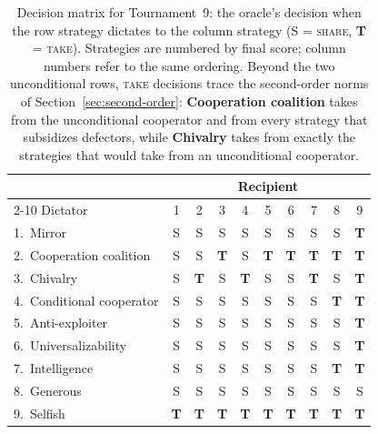 
\newcommand{\dS}{S}
\newcommand{\dT}{{\color{red!60!black}\textbf{T}}}

\newcommand{\paybox}[1]{\textcolor{#1}{\rule[-1.5pt]{8pt}{8pt}}}
\newcommand{\pL}{\paybox{payExploited}}
\newcommand{\pA}{\paybox{payAlone}}
\newcommand{\pM}{\paybox{payMutual}}
\newcommand{\pH}{\paybox{payExploiter}}

\begin{table}[t]
\centering
\small
\begin{tabular}{l*{9}{c}}
\toprule
& \multicolumn{9}{c}{Recipient} \\
\cmidrule(lr){2-10}
Dictator & 1 & 2 & 3 & 4 & 5 & 6 & 7 & 8 & 9 \\
\midrule
1.~Mirror                 & \dS & \dS & \dS & \dS & \dS & \dS & \dS & \dS & \dT \\
2.~Cooperation coalition  & \dS & \dS & \dT & \dS & \dT & \dT & \dT & \dT & \dT \\
3.~Chivalry               & \dS & \dT & \dS & \dT & \dS & \dS & \dT & \dS & \dT \\
4.~Conditional cooperator & \dS & \dS & \dS & \dS & \dS & \dS & \dS & \dT & \dT \\
5.~Anti-exploiter         & \dS & \dS & \dS & \dS & \dS & \dS & \dS & \dS & \dT \\
6.~Universalizability     & \dS & \dS & \dS & \dS & \dS & \dS & \dS & \dS & \dT \\
7.~Intelligence           & \dS & \dS & \dS & \dS & \dS & \dS & \dS & \dT & \dT \\
8.~Generous               & \dS & \dS & \dS & \dS & \dS & \dS & \dS & \dS & \dS \\
9.~Selfish                & \dT & \dT & \dT & \dT & \dT & \dT & \dT & \dT & \dT \\
\bottomrule
\end{tabular}
\caption{Decision matrix for Tournament~9: the oracle's decision when the
row strategy dictates to the column strategy
(\dS{} = \textsc{share}, \dT{} = \textsc{take}).
Strategies are numbered by final score; column numbers refer to the same
ordering.
Beyond the two unconditional rows, \textsc{take} decisions trace the
second-order norms of Section~\ref{sec:second-order}:
\textbf{Cooperation coalition} takes from the unconditional cooperator and
from every strategy that subsidizes defectors, while \textbf{Chivalry}
takes from exactly the strategies that would take from an unconditional
cooperator.}
\label{tab:decision-matrix}
\end{table}

